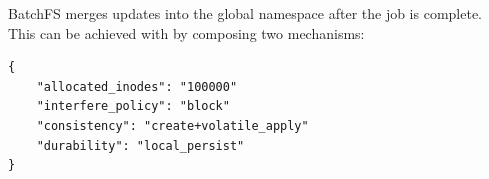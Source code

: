 BatchFS merges updates into the global namespace after the job is complete.
This can be achieved with by composing two mechanisms: 

\begin{listing}[h]
\begin{verbatim}
{     
    "allocated_inodes": "100000"
    "interfere_policy": "block"
    "consistency": "create+volatile_apply"
    "durability": "local_persist"
}
\end{verbatim}
\end{listing}
